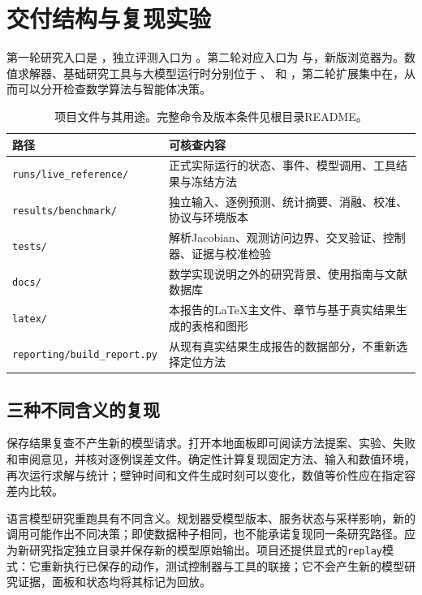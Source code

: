 \section{交付结构与复现实验}
\label{app:reproduction}

第一轮研究入口是 ，独立评测入口为 。第二轮对应入口为 与，新版浏览器为。数值求解器、基础研究工具与大模型运行时分别位于 、 和 ，第二轮扩展集中在，从而可以分开检查数学算法与智能体决策。

\begin{table}[htbp]
\centering\small
\caption{项目文件与其用途。完整命令及版本条件见根目录README。}
\begin{tabularx}{\linewidth}{@{}p{49mm}Y@{}}
\toprule
路径 & 可核查内容\\
\midrule
\texttt{runs/live\_reference/} & 正式实际运行的状态、事件、模型调用、工具结果与冻结方法\\
\texttt{results/benchmark/} & 独立输入、逐例预测、统计摘要、消融、校准、协议与环境版本\\
\texttt{tests/} & 解析Jacobian、观测访问边界、交叉验证、控制器、证据与校准检验\\
\texttt{docs/} & 数学实现说明之外的研究背景、使用指南与文献数据库\\
\texttt{latex/} & 本报告的LaTeX主文件、章节与基于真实结果生成的表格和图形\\
\texttt{reporting/build\_report.py} & 从现有真实结果生成报告的数据部分，不重新选择定位方法\\
\bottomrule
\end{tabularx}
\end{table}

\subsection{三种不同含义的复现}
保存结果复查不产生新的模型请求。打开本地面板即可阅读方法提案、实验、失败和审阅意见，并核对逐例误差文件。确定性计算复现固定方法、输入和数值环境，再次运行求解与统计；壁钟时间和文件生成时刻可以变化，数值等价性应在指定容差内比较。

语言模型研究重跑具有不同含义。规划器受模型版本、服务状态与采样影响，新的调用可能作出不同决策；即使数据种子相同，也不能承诺复现同一条研究路径。应为新研究指定独立目录并保存新的模型原始输出。项目还提供显式的\texttt{replay}模式：它重新执行已保存的动作，测试控制器与工具的联接；它不会产生新的模型研究证据，面板和状态均将其标记为回放。

